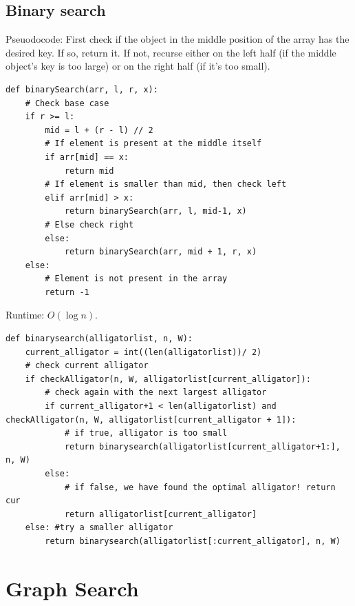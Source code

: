 \documentclass[12pt]{article}
\begin{document}
\subsection*{Binary search}
Pseuodocode: First check if the object in the middle position of the array has the desired key. If so, return it. If not, recurse either on the left half (if the middle object’s key is too large) or on the right half (if it’s too small).
\begin{mdframed}
\begin{verbatim}
def binarySearch(arr, l, r, x):
    # Check base case
    if r >= l:
        mid = l + (r - l) // 2
        # If element is present at the middle itself
        if arr[mid] == x:
            return mid
        # If element is smaller than mid, then check left
        elif arr[mid] > x:
            return binarySearch(arr, l, mid-1, x)
        # Else check right
        else:
            return binarySearch(arr, mid + 1, r, x)
    else:
        # Element is not present in the array
        return -1
\end{verbatim}
\end{mdframed}
Runtime: $O(\log n)$.
\begin{mdframed}
\begin{verbatim}
def binarysearch(alligatorlist, n, W):
    current_alligator = int((len(alligatorlist))/ 2)
    # check current alligator
    if checkAlligator(n, W, alligatorlist[current_alligator]):
        # check again with the next largest alligator
        if current_alligator+1 < len(alligatorlist) and checkAlligator(n, W, alligatorlist[current_alligator + 1]):
            # if true, alligator is too small
            return binarysearch(alligatorlist[current_alligator+1:], n, W)
        else:
            # if false, we have found the optimal alligator! return cur
            return alligatorlist[current_alligator]
    else: #try a smaller alligator
        return binarysearch(alligatorlist[:current_alligator], n, W)
\end{verbatim}
\end{mdframed}
\newpage
\section{Graph Search}
\end{document}
